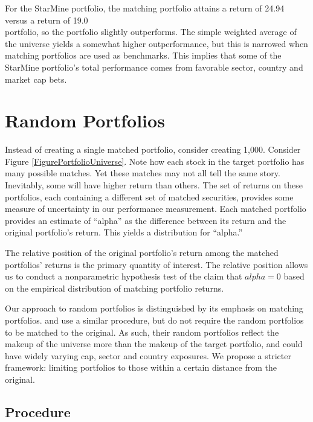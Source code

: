 \documentclass{article}\usepackage{graphicx, color}
\begin{document}
For the StarMine portfolio, the matching portfolio attains a return of
24.94\\%
versus a return of 19.0\\%
portfolio, so the portfolio slightly outperforms. The simple
weighted average of the universe yields a somewhat higher
outperformance, but this is narrowed when matching portfolios are used
as benchmarks. This implies that some of the StarMine portfolio's
total performance comes from favorable sector, country and market cap
bets.

\section{Random Portfolios}

Instead of creating a single matched portfolio, consider creating
1,000. Consider Figure \ref{FigurePortfolioUniverse}. Note how each
stock in the target portfolio has many possible matches. Yet these
matches may not all tell the same story. Inevitably, some will have
higher return than others. The set of returns on these portfolios,
each containing a different set of matched securities, provides some
measure of uncertainty in our performance measurement. Each matched
portfolio provides an estimate of ``alpha'' as the difference between
its return and the original portfolio's return. This yields a
distribution for ``alpha.''

The relative position of the original portfolio's return among the
matched portfolios' returns is the primary quantity of interest. The
relative position allows us to conduct a nonparametric hypothesis test
of the claim that $alpha = 0$ based on the empirical distribution of
matching portfolio returns.

Our approach to random portfolios is distinguished by its emphasis on
matching portfolios. \cite{burns04} and \cite{dawson03} use a similar
procedure, but do not require the random portfolios to be matched to
the original. As such, their random portfolios reflect the makeup of
the universe more than the makeup of the target portfolio, and could
have widely varying cap, sector and country exposures. We propose a
stricter framework: limiting portfolios to those within a certain
distance from the original.

\subsection{Procedure}
\end{document}
